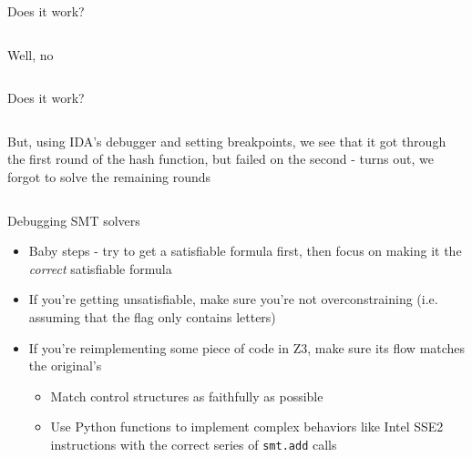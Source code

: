 \begin{frame}{Does it work?}
    \begin{columns}
        Well, no

         \\
    \end{columns}
\end{frame}

\begin{frame}{Does it work?}
    \begin{columns}
        But, using IDA's debugger and setting breakpoints, we see that it
        got through the first round of the hash function, but failed on the
        second - turns out, we forgot to solve the remaining rounds

    \end{columns}
\end{frame}

\begin{frame}{Debugging SMT solvers}
    \begin{itemize}
        \item<1-> Baby steps - try to get a satisfiable formula first, then
                  focus on making it the {\em correct} satisfiable formula
        \item<2-> If you're getting unsatisfiable, make sure you're not
                  overconstraining (i.e. assuming that the flag only contains
                  letters)
        \item<3-> If you're reimplementing some piece of code in Z3, make sure
                  its flow matches the original's
        \begin{itemize}
            \item<4-> Match control structures as faithfully as possible
            \item<5-> Use Python functions to implement complex behaviors like
                      Intel SSE2 instructions with the correct series of 
                      \texttt{smt.add} calls
        \end{itemize}
    \end{itemize}
\end{frame}

